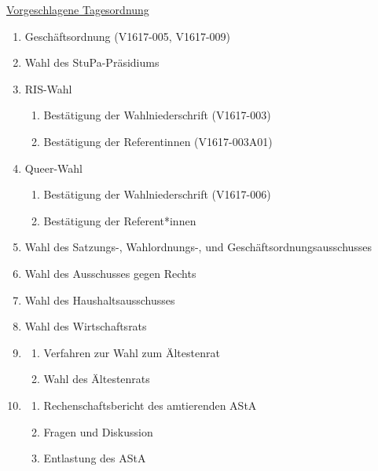 \documentclass[ngerman,headheight=70pt]{scrartcl}
\begin{document}
    \newpage
    \underline{Vorgeschlagene Tagesordnung}
    \begin{enumerate}[label={\textbf{Top \theenumi}},leftmargin=*]
        \item Geschäftsordnung (V1617-005, V1617-009)
        \item Wahl des StuPa-Präsidiums
        \item RIS-Wahl
            \begin{enumerate}
                \item Bestätigung der Wahlniederschrift (V1617-003)
                \item Bestätigung der Referentinnen (V1617-003A01)
            \end{enumerate}
        \item Queer-Wahl
            \begin{enumerate}
                \item Bestätigung der Wahlniederschrift (V1617-006)
                \item Bestätigung der Referent*innen
            \end{enumerate}
        \item Wahl des Satzungs-, Wahlordnungs-, und Geschäftsordnungsausschusses
        \item Wahl des Ausschusses gegen Rechts
        \item Wahl des Haushaltsausschusses
        \item Wahl des Wirtschaftsrats
        \item
            \begin{enumerate}
                \item Verfahren zur Wahl zum Ältestenrat
                \item Wahl des Ältestenrats
            \end{enumerate}
        \item
            \begin{enumerate}
                \item Rechenschaftsbericht des amtierenden AStA
                \item Fragen und Diskussion
                \item Entlastung des AStA
            \end{enumerate}

\end{enumerate}
\end{document}
